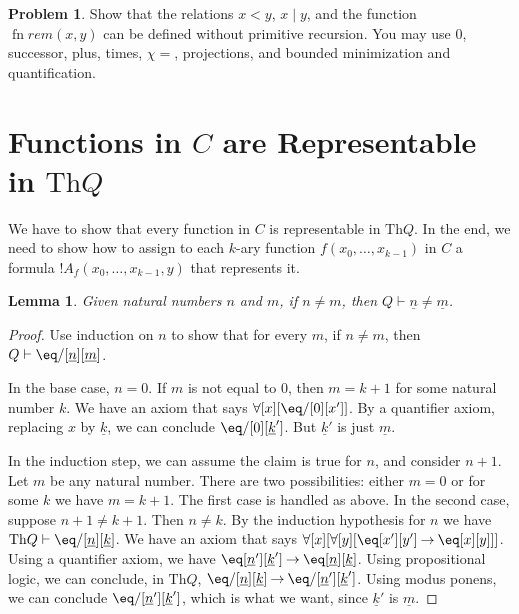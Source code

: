 \documentclass[10pt,a4paper]{article}
\theoremstyle{plain}
\newtheorem{lem}[thm]{Lemma}
\theoremstyle{definition}
\newtheorem{prob}{Problem}[section]
\theoremstyle{remark}
\newcommand*{\olfileid}[3]{}
\newcommand*{\olsection}[1]{\section*{#1}}
\providecommand{\lif}{\mathbin{\rightarrow}}
\providecommand{\lforall}{\mathord{\forall}}
\providecommand{\Proves}{\mathrel{\vdash}}
\providecommand{\Th}{\ensuremath{\mathrm{Th}}}
\providecommand{\num}[1]{\underline{#1}}
\providecommand{\Char}{\chi}
\providecommand{\fn}{\operatorname{fn}}
\providecommand{\fn}{\operatorname{fn}}
\begin{document}
\begin{prob}
  Show that the relations $x < y$, $x \mid y$, and the
  function~$\fn{rem}(x,y)$ can be defined without primitive recursion.
  You may use $0$, successor, plus, times, $\Char{=}$, projections,
  and bounded minimization and quantification.
\end{prob}





\olfileid{inc}{req}{cre}
\olsection{Functions in $C$ are Representable in $\Th{Q}$}

We have to show that every function in $C$ is representable in
$\Th{Q}$. In the end, we need to show how to assign to each $k$-ary
function $f(x_0,\dots,x_{k-1})$ in $C$ a formula
$!A_f(x_0,\dots,x_{k-1},y)$ that represents it.

\begin{lem}
Given natural numbers $n$ and $m$, if $n \neq m$, then $Q \Proves \num
n \neq \num m$.
\end{lem}

\begin{proof}
Use induction on $n$ to show that for every $m$, if $n \neq m$, then
$Q \Proves \eq/[\num n][\num m]$.

In the base case, $n = 0$. If $m$ is not equal to $0$, then $m = k +
1$ for some natural number $k$. We have an axiom that says
$\lforall[x][\eq/[0][x']]$. By a quantifier axiom, replacing $x$ by
  $\num k$, we can conclude $\eq/[0][\num k']$. But $\num k'$ is just
  $\num m$.

In the induction step, we can assume the claim is true for $n$, and
consider $n+1$. Let $m$ be any natural number. There are two
possibilities: either $m = 0$ or for some $k$ we have $m = k+1$. The
first case is handled as above. In the second case, suppose $n+1 \neq
k+1$. Then $n \neq k$. By the induction hypothesis for $n$ we have
$\Th{Q} \Proves \eq/[\num n][\num k]$. We have an axiom that says
$\lforall[x][\lforall[y][\eq[x'][y'] \lif \eq[x][y]]]$. Using a
quantifier axiom, we have $\eq[\num n'][\num k'] \lif \eq[\num n][\num
  k]$. Using propositional logic, we can conclude, in $\Th{Q}$,
$\eq/[\num n][\num k] \lif \eq/[\num n'][\num k']$. Using modus
ponens, we can conclude $\eq/[\num n'][\num k']$, which is what we want,
since $\num k'$ is $\num m$.
\end{proof}
\end{document}
